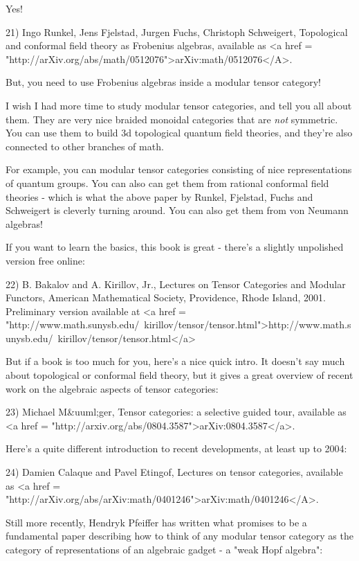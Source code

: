 Yes!

21) Ingo Runkel, Jens Fjelstad, Jurgen Fuchs, Christoph Schweigert,
Topological and conformal field theory as Frobenius algebras,
available as <a href =
"http://arXiv.org/abs/math/0512076">arXiv:math/0512076</A>.

But, you need to use Frobenius algebras inside a modular tensor
category!  

I wish I had more time to study modular tensor categories, and tell
you all about them.  They are very nice braided monoidal categories
that are \emph{not} symmetric.  You can use them to build 3d topological 
quantum field theories, and they're also connected to other branches
of math.  

For example, you can modular tensor categories consisting of nice
representations of quantum groups.  You can also can get them from 
rational conformal field theories - which is what the above paper by 
Runkel, Fjelstad, Fuchs and Schweigert is cleverly turning around.  
You can also get them from von Neumann algebras!

If you want to learn the basics, this book is great - there's a 
slightly unpolished version free online:

22) B. Bakalov and A. Kirillov, Jr., Lectures on Tensor Categories 
and Modular Functors, American Mathematical Society, Providence, 
Rhode Island, 2001.  Preliminary version available at
<a href = "http://www.math.sunysb.edu/~kirillov/tensor/tensor.html">http://www.math.sunysb.edu/~kirillov/tensor/tensor.html</a>

But if a book is too much for you, here's a nice quick intro.  It 
doesn't say much about topological or conformal field theory, but it 
gives a great overview of recent work on the algebraic aspects of 
tensor categories:

23) Michael M&uuml;ger, Tensor categories: a selective guided tour,
available as <a href =
"http://arxiv.org/abs/0804.3587">arXiv:0804.3587</a>.

Here's a quite different introduction to recent developments, at 
least up to 2004:

24) Damien Calaque and Pavel Etingof, Lectures on tensor categories,
available as <a href = "http://arXiv.org/abs/arXiv:math/0401246">arXiv:math/0401246</A>.

Still more recently, Hendryk Pfeiffer has written what promises to 
be a fundamental paper describing how to think of any modular tensor 
category as the category of representations of an algebraic gadget - 
a "weak Hopf algebra":

